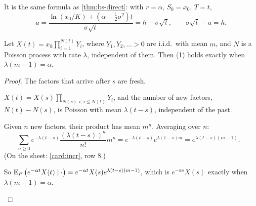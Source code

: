 It is the same formula as \cref{thm:bs-direct}: with $r=\alpha$, $S_0=x_0$, $T=t$,
\[
  -a=\frac{\ln(x_0/K)+(\alpha-\frac12\sigma^2)t}{\sigma\sqrt t}=h-\sigma\sqrt t,\qquad\sigma\sqrt t-a=h.
\]

\begin{result}
\label{res:jump-drift}
Let $X(t)=x_0\prod_{i=1}^{N(t)}Y_i$, where $Y_1,Y_2,\dots>0$ are i.i.d.\ with mean $m$, and $N$ is a Poisson process with rate $\lambda$, independent of them. Then (1) holds exactly when $\lambda(m-1)=\alpha$.
\end{result}
\begin{proof}
The factors that arrive after $s$ are fresh.
\begin{steps}
  \item $X(t)=X(s)\prod_{N(s)<i\le N(t)}Y_i$, and the number of new factors, $N(t)-N(s)$, is Poisson with mean $\lambda(t-s)$, independent of the past.
  \item Given $n$ new factors, their product has mean $m^n$. Averaging over $n$:
  \[
    \sum_{n\ge0}e^{-\lambda(t-s)}\frac{(\lambda(t-s))^n}{n!}m^n=e^{-\lambda(t-s)}e^{\lambda(t-s)m}=e^{\lambda(t-s)(m-1)}.
  \]
  (On the sheet: \cref{card:incr}, row 8.)
  \item So $\operatorname{E}_P\big(e^{-\alpha t}X(t)\mid\cdot\big)=e^{-\alpha t}X(s)e^{\lambda(t-s)(m-1)}$, which is $e^{-\alpha s}X(s)$ exactly when $\lambda(m-1)=\alpha$. \qedhere
\end{steps}
\end{proof}


